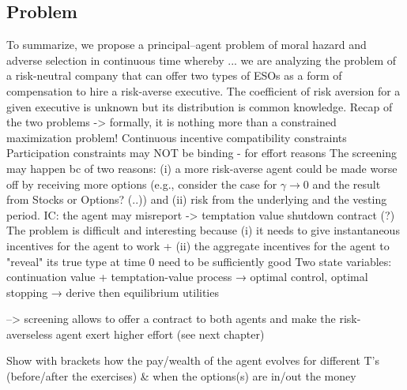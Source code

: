 \subsection{Problem}
To summarize, we propose a principal–agent problem of moral hazard and adverse selection in continuous time whereby ... we are analyzing the problem of a risk-neutral company that can offer two types of ESOs as a form of compensation to hire a risk-averse executive. The coefficient of risk aversion for a given executive is unknown but its distribution is common knowledge.
Recap of the two problems
-> formally, it is nothing more than a constrained maximization problem!
Continuous incentive compatibility constraints
Participation constraints may NOT be binding - for effort reasons
The screening may happen bc of two reasons: (i) a more risk-averse agent could be made worse off by receiving more options (e.g., consider the case for $\gamma \rightarrow 0$ and the result from Stocks or Options? (..)) and (ii) risk from the underlying and the vesting period.
IC: the agent may misreport -> temptation value
shutdown contract (?)
The problem is difficult and interesting because (i) it needs to give instantaneous incentives for the agent to work + (ii) the aggregate incentives for the agent to "reveal" its true type at time 0 need to be sufficiently good
Two state variables: continuation value + temptation-value process
→ optimal control, optimal stopping → derive then equilibrium utilities

--> screening allows to offer a contract to both agents and make the risk-averseless agent exert higher effort (see next chapter)

Show with brackets how the pay/wealth of the agent evolves for different T's (before/after the exercises) \& when the options(s) are in/out the money



